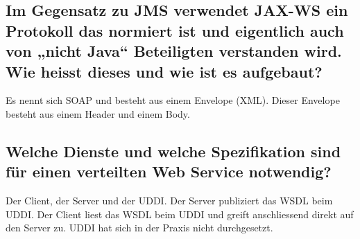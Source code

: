 \subsection{Im Gegensatz zu JMS verwendet JAX-WS ein Protokoll das normiert ist und eigentlich auch von „nicht Java“ Beteiligten verstanden wird. Wie heisst dieses und wie ist es aufgebaut?}
Es nennt sich SOAP und besteht aus einem Envelope (XML). Dieser Envelope besteht aus einem Header und einem Body.

\subsection{Welche Dienste und welche Spezifikation sind für einen verteilten Web Service notwendig?}
Der Client, der Server und der UDDI. Der Server publiziert das WSDL beim UDDI. Der Client liest das WSDL beim UDDI und greift anschliessend direkt auf den Server zu. UDDI hat sich in der Praxis nicht durchgesetzt.